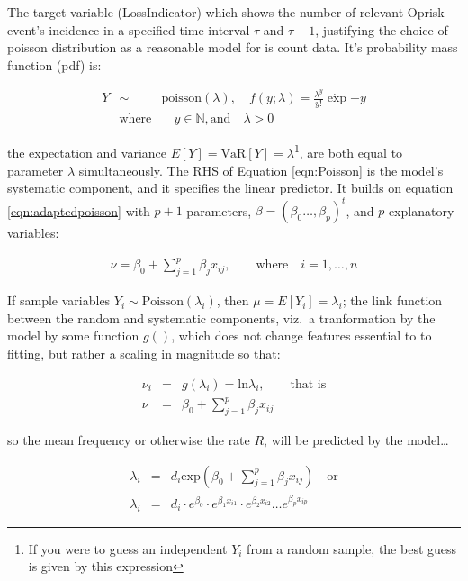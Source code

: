 \documentclass[]{article}
\let\rmarkdownfootnote\footnote%
\def\footnote{\protect\rmarkdownfootnote}
\begin{document}
The target variable (LossIndicator) which shows the number of relevant
Oprisk event's incidence in a specified time interval \(\tau\) and
\(\tau+1\), justifying the choice of poisson distribution as a
reasonable model for is count data. It's probability mass function (pdf)
is:

\singlespacing

\begin{eqnarray}\label{eqn:Poisson}
Y &\sim& \mbox{poisson}(\lambda), \quad f(y;\lambda) = \frac{\lambda^y}{y!}\dot\exp{-y}\\
 &\mbox{where}& \quad y \in  \mathbb{N}, \mbox{and} \quad \lambda > 0 \nonumber
\end{eqnarray} \doublespacing

the expectation and variance
\(E[Y] = \mbox{VaR}[Y] = \lambda\)\footnote{If you were to guess an independent $Y_i$ from a random sample, the best guess is given by this expression},
are both equal to parameter \(\lambda\) simultaneously. The RHS of
Equation \ref{eqn:Poisson} is the model's systematic component, and it
specifies the linear predictor. It builds on equation
\ref{eqn:adaptedpoisson} with \(p+1\) parameters,
\(\beta = (\beta_0\ldots,\beta_p)^t\), and \(p\) explanatory variables:

\singlespacing

\begin{eqnarray}
\nu = \beta_0 + \sum_{j=1}^{p}\beta_jx_{ij}, \qquad \mbox{where} \quad i = 1,\ldots,n
\end{eqnarray} \doublespacing

If sample variables \(Y_i \sim \mbox{Poisson}(\lambda_i)\), then
\(\mu = E[Y_i] = \lambda_i\); the link function between the random and
systematic components, viz.~a tranformation by the model by some
function \(g()\), which does not change features essential to to
fitting, but rather a scaling in magnitude so that:

\singlespacing

\begin{eqnarray}\label{eqn:linkfcn }
\nu_i &=& g(\lambda_i) = \mbox{ln}\lambda_i, \qquad \mbox{that is} \nonumber \\
\nu &=& \beta_0 + \sum_{j=1}^{p}\beta_jx_{ij}
\end{eqnarray} \doublespacing

so the mean frequency or otherwise the rate \(R\), will be predicted by
the model\ldots

\singlespacing

\begin{eqnarray}\label{eqn:multmodel}
\lambda_i &=& d_i\mbox{exp}(\beta_0 + \sum_{j=1}^{p}\beta_jx_{ij}) \quad \mbox{or} \nonumber \\
\lambda_i &=& d_i\cdot e^{\beta_0}\cdot e^{\beta_1x_{i1}}\cdot e^{\beta_2x_{i2}} \ldots e^{\beta_px_{ip}}
\end{eqnarray} \doublespacing
\end{document}
